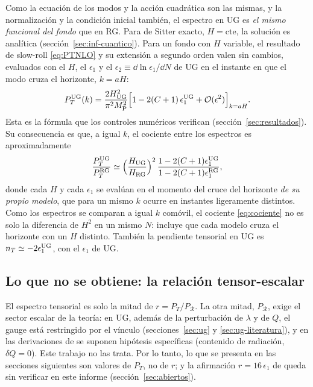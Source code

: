 Como la ecuación de los modos y la acción cuadrática son las mismas, y la normalización y la condición inicial también, el espectro en UG es \emph{el mismo funcional del fondo} que en RG. Para de Sitter exacto, $H=\text{cte}$, la solución es analítica (sección~\ref{sec:inf-cuantico}). Para un fondo con $H$ variable, el resultado de slow-roll \eqref{eq:PTNLO} y su extensión a segundo orden \cite{martin14} valen sin cambios, evaluados con el $H$, el $\epsilon_1$ y el $\epsilon_2\equiv\dd\ln\epsilon_1/\dd N$ de UG en el instante en que el modo cruza el horizonte, $k=aH$:
\begin{equation}
P_T^{\rm UG}(k)=\frac{2H_{\rm UG}^2}{\pi^2M_{\rm P}^2}\Big[1-2(C+1)\,\epsilon_1^{\rm UG}+\mathcal O(\epsilon^2)\Big]_{k=aH}.
\label{eq:PTUG}
\end{equation}
Esta es la fórmula que los controles numéricos verifican (sección~\ref{sec:resultados}). Su consecuencia es que, a igual $k$, el cociente entre los espectros es aproximadamente
\begin{equation}
\frac{P_T^{\rm UG}}{P_T^{\rm RG}}\simeq\Big(\frac{H_{\rm UG}}{H_{\rm RG}}\Big)^2\,\frac{1-2(C+1)\epsilon_1^{\rm UG}}{1-2(C+1)\epsilon_1^{\rm RG}},
\label{eq:cociente}
\end{equation}
donde cada $H$ y cada $\epsilon_1$ se evalúan en el momento del cruce del horizonte \emph{de su propio modelo}, que para un mismo $k$ ocurre en instantes ligeramente distintos. Como los espectros se comparan a igual $k$ comóvil, el cociente \eqref{eq:cociente} no es solo la diferencia de $H^2$ en un mismo $N$: incluye que cada modelo cruza el horizonte con un $H$ distinto. También la pendiente tensorial en UG es $n_T\simeq-2\epsilon_1^{\rm UG}$, con el $\epsilon_1$ de UG.

\subsection{Lo que no se obtiene: la relación tensor-escalar}

El espectro tensorial es solo la mitad de $r=P_T/P_\mathcal{R}$. La otra mitad, $P_\mathcal{R}$, exige el sector escalar de la teoría: en UG, además de la perturbación de $\lambda$ y de $Q$, el gauge está restringido por el vínculo (secciones~\ref{sec:ug} y \ref{sec:ug-literatura}), y en las derivaciones de \cite{leon22} se suponen hipótesis específicas (contenido de radiación, $\delta Q=0$). Este trabajo no las trata. Por lo tanto, lo que se presenta en las secciones siguientes son valores de $P_T$, no de $r$; y la afirmación $r=16\,\epsilon_1$ de \cite{piccirilli23} queda sin verificar en este informe (sección~\ref{sec:abiertos}).
